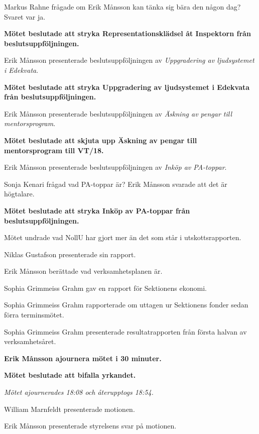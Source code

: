 \documentclass[10pt]{article}
\begin{document}
\begin{paragrafer}
Markus Rahne frågade om Erik Månsson kan tänka sig bära den någon dag? Svaret var ja.

\textbf{Mötet beslutade att stryka Representationsklädsel åt Inspektorn från beslutsuppföljningen.}

Erik Månsson presenterade beslutsuppföljningen av \emph{Uppgradering av ljudsystemet i Edekvata}.

\textbf{Mötet beslutade att stryka Uppgradering av ljudsystemet i Edekvata från beslutsuppföljningen.}

Erik Månsson presenterade beslutsuppföljningen av \emph{Äskning av pengar till mentorsprogram}.

\textbf{Mötet beslutade att skjuta upp Äskning av pengar till mentorsprogram till VT/18.}

Erik Månsson presenterade beslutsuppföljningen av \emph{Inköp av PA-toppar}.

Sonja Kenari frågad vad PA-toppar är? Erik Månsson svarade att det är högtalare.

\textbf{Mötet beslutade att stryka Inköp av PA-toppar från beslutsuppföljningen.}

Mötet undrade vad NollU har gjort mer än det som står i utskottsrapporten.

Niklas Gustafson presenterade sin rapport.

Erik Månsson berättade vad verksamhetsplanen är.

Sophia Grimmeiss Grahm gav en rapport för Sektionens ekonomi.

Sophia Grimmeiss Grahm rapporterade om uttagen ur Sektionens fonder sedan förra terminsmötet.

Sophia Grimmeiss Grahm presenterade resultatrapporten från första halvan av verksamhetsåret.

\textbf{Erik Månsson \ypa ajournera mötet i 30 minuter.}

\textbf{Mötet beslutade att bifalla yrkandet.}

\emph{Mötet ajournerades 18:08 och återupptogs 18:54.}

    \begin{paragrafer}
        William Marnfeldt presenterade motionen.

        Erik Månsson presenterade styrelsens svar på motionen.


\end{paragrafer}
\end{paragrafer}
\end{document}
